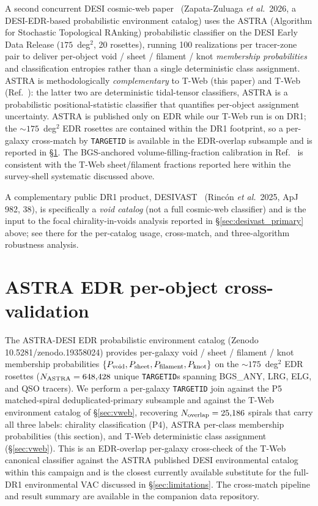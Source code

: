 \documentclass[aps,prd,twocolumn,superscriptaddress,showpacs,preprintnumbers,nofootinbib,longbibliography,floatfix]{revtex4-2}
\begin{document}
A second concurrent DESI cosmic-web paper~\cite{ASTRADESI2026} (Zapata-Zuluaga
\textit{et al.}\ 2026, a DESI-EDR-based probabilistic environment catalog) uses
the ASTRA (Algorithm for Stochastic Topological RAnking) probabilistic
classifier on the DESI Early Data Release ($175$~deg$^{2}$, 20
rosettes), running 100 realizations per tracer-zone pair to deliver
per-object void / sheet / filament / knot \emph{membership
probabilities} and classification entropies rather than a single
deterministic class assignment. ASTRA is methodologically
\emph{complementary} to T-Web (this paper) and T-Web
(Ref.~\cite{TWebDESI2026}): the latter two are deterministic
tidal-tensor classifiers, ASTRA is a probabilistic positional-statistic
classifier that quantifies per-object assignment uncertainty.
ASTRA is published only on EDR while our T-Web run is on DR1; the
$\sim\!175$~deg$^{2}$ EDR rosettes are contained within the DR1
footprint, so a per-galaxy cross-match by \texttt{TARGETID} is
available in the EDR-overlap subsample and is reported in
\S\ref{sec:astra_per_object}. The BGS-anchored volume-filling-fraction
calibration in Ref.~\cite{ASTRADESI2026} is consistent with the T-Web
sheet/filament fractions reported here within the survey-shell
systematic discussed above.

A complementary public DR1 product, DESIVAST~\cite{DESIVAST2025}
(Rinc\'on \textit{et al.}\ 2025, ApJ 982, 38), is specifically a
\emph{void catalog} (not a full cosmic-web classifier) and is the
input to the focal chirality-in-voids analysis reported in
\S\ref{sec:desivast_primary} above; see there for the per-catalog
usage, cross-match, and three-algorithm robustness analysis.

\section{ASTRA EDR per-object
cross-validation}\label{sec:astra_per_object}

The ASTRA-DESI EDR probabilistic environment catalog
\cite{ASTRADESI2026} (Zenodo 10.5281/zenodo.19358024) provides
per-galaxy void / sheet / filament / knot membership probabilities
$\{P_{\rm void}, P_{\rm sheet}, P_{\rm filament}, P_{\rm knot}\}$ on
the $\sim\!175$~deg$^{2}$ EDR rosettes ($N_{\rm ASTRA} = 648{,}428$
unique \texttt{TARGETID}s spanning BGS\_ANY, LRG, ELG, and QSO
tracers). We perform a per-galaxy \texttt{TARGETID} join against the
P5 matched-spiral deduplicated-primary subsample and against the T-Web
environment catalog of \S\ref{sec:vweb}, recovering
$N_{\rm overlap} = 25{,}186$ spirals that carry all three labels:
chirality classification (P4), ASTRA per-class membership probabilities
(this section), and T-Web deterministic class assignment
(\S\ref{sec:vweb}). This is an EDR-overlap per-galaxy cross-check of
the T-Web canonical classifier against the ASTRA published DESI
environmental catalog within this campaign and is the closest currently
available substitute for the full-DR1 environmental VAC discussed in
\S\ref{sec:limitations}. The cross-match pipeline and result summary are available in the companion data repository.
\end{document}
